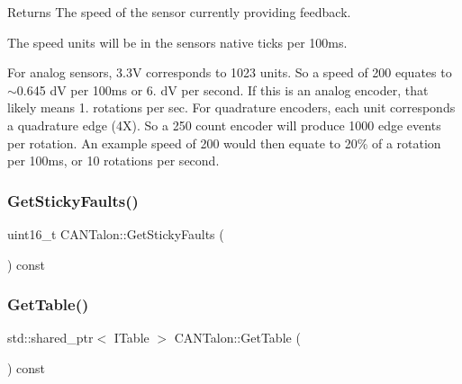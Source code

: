 \begin{DoxyReturn}{Returns}
The speed of the sensor currently providing feedback.
\end{DoxyReturn}
The speed units will be in the sensor\textquotesingle{}s native ticks per 100ms.

For analog sensors, 3.\+3V corresponds to 1023 units. So a speed of 200 equates to $\sim$0.645 dV per 100ms or 6. dV per second. If this is an analog encoder, that likely means 1. rotations per sec. For quadrature encoders, each unit corresponds a quadrature edge (4X). So a 250 count encoder will produce 1000 edge events per rotation. An example speed of 200 would then equate to 20\% of a rotation per 100ms, or 10 rotations per second. \mbox{\label{class_c_a_n_talon_a994239a9436868e2fee189ce87b7c9be}} 
\subsubsection{\texorpdfstring{Get\+Sticky\+Faults()}{GetStickyFaults()}}
{\footnotesize\ttfamily uint16\+\_\+t C\+A\+N\+Talon\+::\+Get\+Sticky\+Faults (\begin{DoxyParamCaption}{ }\end{DoxyParamCaption}) const}

\mbox{\label{class_c_a_n_talon_ab02a755b0e649792fd50eadeb6868ff5}} 
\subsubsection{\texorpdfstring{Get\+Table()}{GetTable()}}
{\footnotesize\ttfamily std\+::shared\+\_\+ptr$<$ I\+Table $>$ C\+A\+N\+Talon\+::\+Get\+Table (\begin{DoxyParamCaption}{ }\end{DoxyParamCaption}) const\hspace{0.3cm}{\ttfamily [override]}}

\mbox{\label{class_c_a_n_talon_ad598ba3f77946f1f09d1e3ed5eb8fe75}} 
